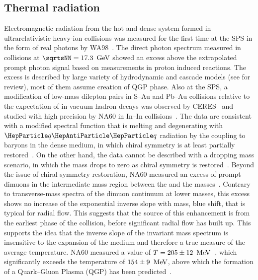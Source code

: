 \documentclass[../report.tex]{subfiles}
\begin{document}
\subsection{Thermal radiation}

Electromagnetic radiation from the hot and dense system formed in ultrarelativistic heavy-ion collisions was measured for the first time at the SPS in the form of real photons by WA98~\cite{Aggarwal:2000th}. The direct photon spectrum measured in \PbPb{} collisions at $\sqrtsNN = \unit[17.3]{\UGeV}$ showed an excess above the extrapolated prompt photon signal based on measurements in proton induced reactions. 
The excess is described by large variety of hydrodynamic and cascade models (see \cite{Peitzmann:2001mz} for review), most of them assume creation of QGP phase.
Also at the SPS, a modification of low-mass dilepton pairs in S--Au and Pb--Au collisions relative to the expectation of in-vacuum hadron decays was observed by CERES~\cite{Agakishiev:1995xb,Agakishiev:1997au,Adamova:2002kf,Agakichiev:2005ai,Adamova:2006nu} and studied with high precision by NA60 in In--In collisions~\cite{Arnaldi:2006jq,Arnaldi:2007ru,Arnaldi:2008fw,Specht:2010xu}. The data are consistent with a modified \PGr spectral function that is melting and degenerating with $\PQq\PAQq$ radiation by the coupling to baryons in the dense medium, in which chiral symmetry is at least partially restored~\cite{Rapp:1995zy,Rapp:1999us,Rapp:2009yu,Bazavov:2011nk,Hohler:2013eba}. On the other hand, the data cannot be described with a dropping mass scenario, in which the \PGr mass drops to zero as chiral symmetry is restored~\cite{Brown:1991kk}. Beyond the issue of chiral symmetry restoration, NA60 measured an excess of prompt dimuons in the intermediate mass region between the \PGf and the \PJGy masses~\cite{Arnaldi:2007ru,Arnaldi:2008fw}. Contrary to transverse-mass spectra of the dimuon continuum at lower masses, this excess shows no increase of the exponential inverse slope with mass, \ie blue shift, that is typical for radial flow. This suggests that the source of this enhancement is from the earliest phase of the collision, before significant radial flow has built up. 
This supports the idea that the inverse slope of the invariant mass spectrum is insensitive to the expansion of the medium and therefore a true measure of the average temperature. NA60 measured a value of $T=\unit[205\pm12]{\UMeV}$~\cite{Specht:2010xu}, which significantly exceeds the temperature of $\unit[154\pm9]{\UMeV}$, above which the formation of a Quark--Gluon Plasma (QGP) has been predicted~\cite{Borsanyi:2010bp,Bazavov:2014pvz}.
\end{document}
